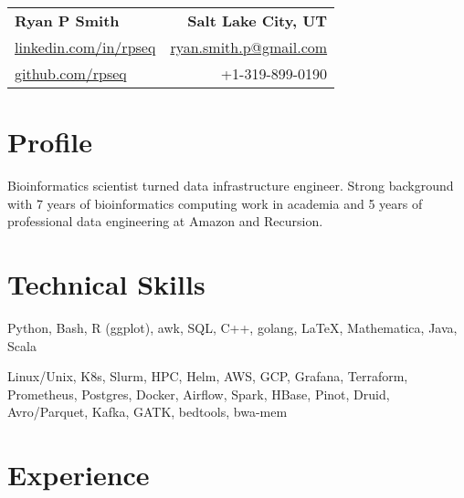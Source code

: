 
\RequirePackage{preamble}



\begin{tabular*}{\textwidth}{l@{\extracolsep{\fill}}r}
	\textbf{{\Large Ryan P Smith}} & \textbf{Salt Lake City, UT} \\
	\href{http://www.linkedin.com/in/rpseq}{linkedin.com/in/rpseq} &
	\href{mailto:ryan.smith.p@gmail.com}{ryan.smith.p@gmail.com} \\
	\href{https://github.com/RPSeq}{github.com/rpseq} & +1-319-899-0190 \\
\end{tabular*}

\section{Profile}

\small{Bioinformatics scientist turned data infrastructure engineer. Strong background with 7 years of bioinformatics computing work in academia and 5 years of professional data engineering at Amazon and Recursion.}


\section{Technical Skills}
\resumeSubHeadingListStart

{Python, Bash, R (ggplot), awk, SQL, C++, golang, \LaTeX, Mathematica, Java, Scala}

{Linux/Unix, K8s, Slurm, HPC, Helm, AWS, GCP, Grafana, Terraform, Prometheus, Postgres, Docker, Airflow, Spark, HBase, Pinot, Druid, Avro/Parquet, Kafka, GATK, bedtools, bwa-mem}

\resumeSubHeadingListEnd

\section{Experience}
\resumeSubHeadingListStart


